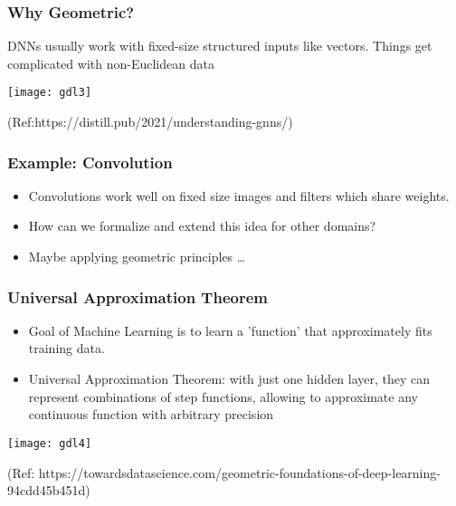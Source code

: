 \begin{frame}[fragile]\frametitle{Why Geometric?}

DNNs usually work with fixed-size structured inputs like vectors. Things get complicated with non-Euclidean data
	  
\begin{center}
\texttt{[image: gdl3]}
\end{center}

{\tiny (Ref:https://distill.pub/2021/understanding-gnns/)}

\end{frame}

\begin{frame}[fragile]\frametitle{Example: Convolution}

\begin{itemize}
\item Convolutions work well on fixed size images and filters which share weights.
\item How can we formalize and extend this idea for other domains? 
\item Maybe applying geometric principles \ldots
\end{itemize}
	  
\end{frame}

\begin{frame}[fragile]\frametitle{Universal Approximation Theorem}

\begin{itemize}
\item Goal of Machine Learning is to learn a 'function' that approximately fits training data.
\item Universal Approximation Theorem: with just one hidden layer, they can represent combinations of step functions, allowing to approximate any continuous function with arbitrary precision
\end{itemize}
	  
\begin{center}
\texttt{[image: gdl4]}
\end{center}

{\tiny (Ref: https://towardsdatascience.com/geometric-foundations-of-deep-learning-94cdd45b451d)}		
\end{frame}

